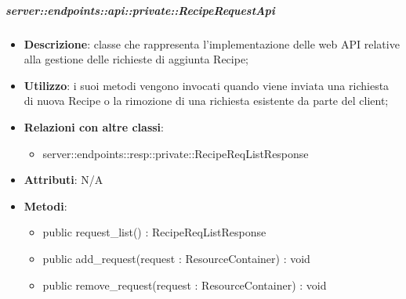     \subparagraph{server::endpoints::api::private::RecipeRequestApi} %
    \label{subp:bdsm_app_server_endpoints_api_private::reciperequestapi}
    \begin{itemize}
      \item \textbf{Descrizione}: classe che rappresenta l'implementazione delle web API relative alla gestione delle richieste di aggiunta Recipe;
      \item \textbf{Utilizzo}: i suoi metodi vengono invocati quando viene inviata una richiesta di nuova Recipe o la rimozione di una richiesta esistente da parte del client;
      \item \textbf{Relazioni con altre classi}:
        \begin{itemize}
          \item server::endpoints::resp::private::RecipeReqListResponse
        \end{itemize}
		\item \textbf{Attributi}: N/A
		\item \textbf{Metodi}:   
			\begin{itemize}
				\item public request\_list() : RecipeReqListResponse
				\item public add\_request(request : ResourceContainer) : void
				\item public remove\_request(request : ResourceContainer) : void
     	 \end{itemize}
      \end{itemize}

